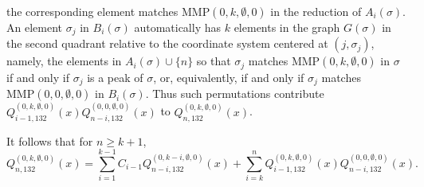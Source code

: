 \documentclass[
final,nomarks
]{dmtcs-episciences}
\newcommand{\Qmmn}[2]{Q_{#2,132}^{(#1)}(x)}
\newcommand{\MMP}{\mathrm{MMP}}
\begin{document}
\begin{enumerate}[{\bf Case }\bf 1.]
the corresponding element matches \begin{math}\MMP(0,k,\emptyset,0)\end{math} in the reduction 
of \begin{math}A_i(\sigma)\end{math}.  An element \begin{math}\sigma_j\end{math} in \begin{math}B_i(\sigma)\end{math} automatically has \begin{math}k\end{math} elements in the graph 
\begin{math}G(\sigma)\end{math} in the second quadrant relative to the coordinate system centered at \begin{math}(j,\sigma_j)\end{math}, 
namely, the elements in \begin{math}A_i(\sigma) \cup \{n\}\end{math} so that \begin{math}\sigma_j\end{math} matches 
\begin{math}\MMP(0,k,\emptyset,0)\end{math} in \begin{math}\sigma\end{math} if and only if \begin{math}\sigma_j\end{math} is a peak of \begin{math}\sigma\end{math}, or, equivalently, 
if and only if \begin{math}\sigma_j\end{math} matches \begin{math}\MMP(0,0,\emptyset,0)\end{math} in \begin{math}B_i(\sigma)\end{math}. Thus such permutations 
contribute \begin{math}\Qmmn{0,k,\emptyset,0}{i-1} \Qmmn{0,0,\emptyset,0}{n-i}\end{math} to \begin{math}\Qmmn{0,k,\emptyset,0}{n}\end{math}.
\end{enumerate}

It follows that for \begin{math}n \geq k+1\end{math}, 
\begin{equation}
\Qmmn{0,k,\emptyset,0}{n}=\sum_{i=1}^{k-1}C_{i-1}\Qmmn{0,k-i,\emptyset,0}{n-i}+\sum_{i=k}^{n}\Qmmn{0,k,\emptyset,0}{i-1}\Qmmn{0,0,\emptyset,0}{n-i}.
\end{equation}
\end{document}

